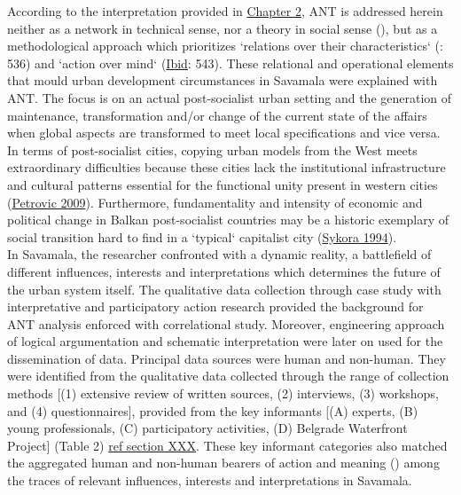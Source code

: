 \documentclass[11pt]{report}
\begin{document}
According to the interpretation provided in \href{}{Chapter 2}, ANT is addressed herein neither as a network in technical sense, nor a theory in social sense (\cite{Latour 1996}), but as a methodological approach which prioritizes  `relations over their characteristics` (\cite{Cerulo 2009}: 536) and `action over mind` (\href{}{Ibid}: 543). These relational and operational elements that mould urban development circumstances in Savamala were explained with ANT. The focus is on an actual post-socialist urban setting and the generation of maintenance, transformation and/or change of the current state of the affairs when global aspects are transformed to meet local specifications and vice versa. In terms of post-socialist cities, copying urban models from the West meets extraordinary difficulties because these cities lack the institutional infrastructure and cultural patterns essential for the functional unity present in western cities (\href{}{Petrovic 2009}). Furthermore, fundamentality and intensity of economic and political change in Balkan post-socialist countries may be a historic exemplary of social transition hard to find in a `typical` capitalist city (\href{}{Sykora 1994}).
\\
In Savamala, the researcher confronted with a dynamic reality, a battlefield of different influences, interests and interpretations which determines the future of the urban system itself. The qualitative data collection through case study with interpretative and participatory action research provided the background for ANT analysis enforced with correlational study. Moreover, engineering approach of logical argumentation and schematic interpretation were later on used for the dissemination of data. Principal data sources were human and non-human. They were identified from the qualitative data collected through the range of collection methods [(1) extensive review of written sources, (2) interviews, (3) workshops, and (4) questionnaires], provided from the key informants [(A) experts, (B) young professionals, (C) participatory activities, (D) Belgrade Waterfront Project] (Table 2) \href{}{ref section XXX}. These key informant categories also matched the aggregated human and non-human bearers of action and meaning (\cite{Latour 2005}) among the traces of relevant influences, interests and interpretations in Savamala.
\\
\end{document}
